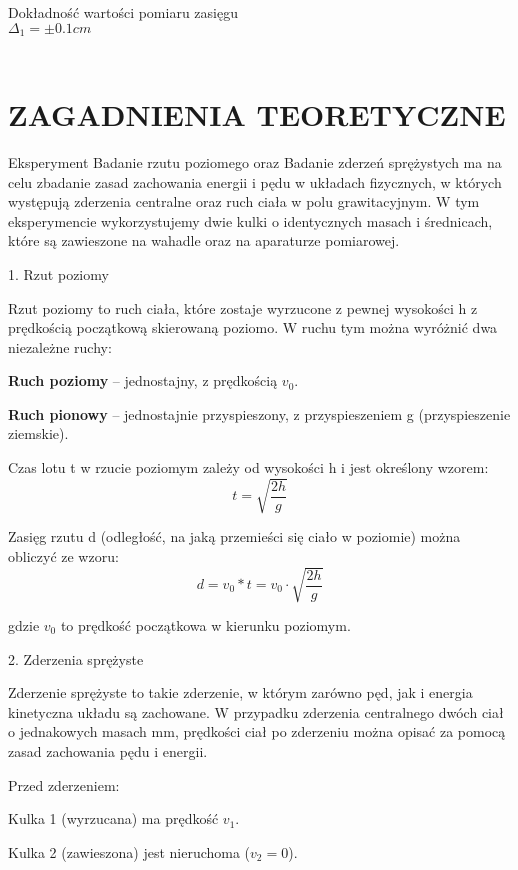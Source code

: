 \documentclass{article}
\begin{document}
\textbf{} \\
\textbf{} \\

\raggedright
    {
        {Dokładność wartości pomiaru zasięgu} \\
        {$\Delta_1 = \pm0.1cm$ }\\
        \textbf{ }\\
    }


\centering

\section*{ZAGADNIENIA TEORETYCZNE}
\raggedright
{Eksperyment Badanie rzutu poziomego oraz Badanie zderzeń sprężystych ma na celu zbadanie zasad zachowania energii i pędu w układach fizycznych, w których występują zderzenia centralne oraz ruch ciała w polu grawitacyjnym. W tym eksperymencie wykorzystujemy dwie kulki o identycznych masach i średnicach, które są zawieszone na wahadle oraz na aparaturze pomiarowej.

1. Rzut poziomy

Rzut poziomy to ruch ciała, które zostaje wyrzucone z pewnej wysokości h z prędkością początkową skierowaną poziomo. W ruchu tym można wyróżnić dwa niezależne ruchy:

    \textbf{Ruch poziomy} – jednostajny, z prędkością $v_0$.

    \textbf{Ruch pionowy} – jednostajnie przyspieszony, z przyspieszeniem g (przyspieszenie ziemskie).

Czas lotu t w rzucie poziomym zależy od wysokości h i jest określony wzorem:
\[ t=\sqrt{\frac{2h}{g}} \]

Zasięg rzutu d (odległość, na jaką przemieści się ciało w poziomie) można obliczyć ze wzoru:
\[ d=v_0*t=v_0⋅\sqrt{\frac{2h}{g}} \]


gdzie $v_0$ to prędkość początkowa w kierunku poziomym.

2. Zderzenia sprężyste

Zderzenie sprężyste to takie zderzenie, w którym zarówno pęd, jak i energia kinetyczna układu są zachowane. W przypadku zderzenia centralnego dwóch ciał o jednakowych masach mm, prędkości ciał po zderzeniu można opisać za pomocą zasad zachowania pędu i energii.

Przed zderzeniem:

    Kulka 1 (wyrzucana) ma prędkość $v_1$.

    Kulka 2 (zawieszona) jest nieruchoma ($v_2=0$).

}
\end{document}
